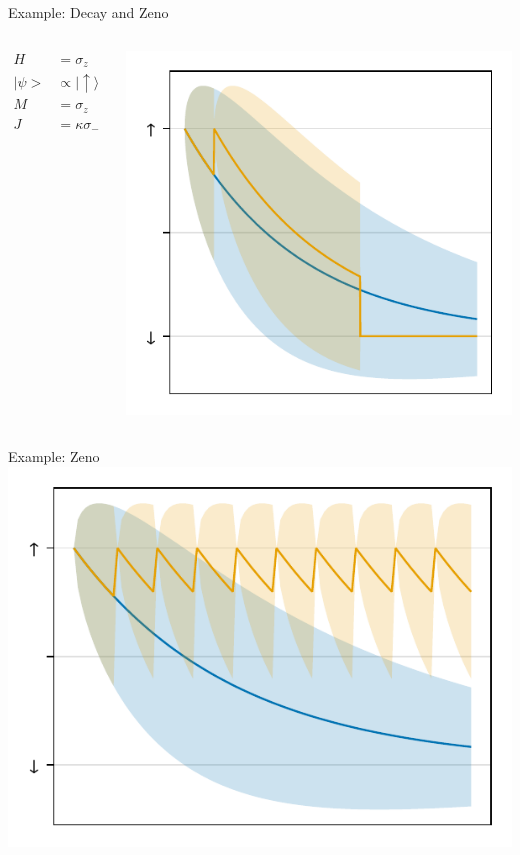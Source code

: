 \documentclass[
]{beamer}
\begin{document}
\begin{frame}{Example: Decay and Zeno}
	\begin{columns}
		\begin{align*}
			H &= \sigma_z\\
			|\psi> &\propto |\uparrow\rangle\\
			M &= \sigma_z\\
			J &= \kappa\sigma_-
		\end{align*}
		
		\centering
		\vspace{-1cm}
		\includegraphics{figures/04 discreate.pdf}
	\end{columns}
\end{frame}

\begin{frame}{Example: Zeno}
	\centering
	\includegraphics{figures/04 discreate zeno.pdf}
\end{frame}
\end{document}
